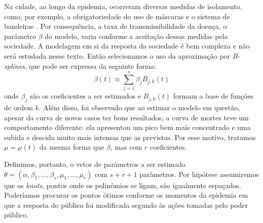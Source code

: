 Na cidade, ao longo da epidemia, ocorreram diversas medidas de isolamento, como, por exemplo, a obrigatoriedade do uso de máscaras \cite{decreto-mascaras} e o sistema de bandeiras \cite{sistemas-bandeiras}.
Por consequência, a taxa de transmissibilidade da doença, o parâmetro $\beta$ do modelo, varia conforme a aceitação dessas medidas pela sociedade.
A modelagem em si da resposta da sociedade é bem complexa e não será estudada nesse texto.
Então selecionamos o uso da aproximação por {\em B-splines}, que pode ser expressa da seguinte forma: 
\begin{equation}
    \label{beta-b-splines}
    \beta(t) \approx \sum_{j=1}^s \beta_j B_{j,k}(t)
\end{equation}
onde $\beta_j$ são os coeficientes a ser estimados e $B_{j,k}(t)$ formam a base de funções de ordem $k$. 
Além disso, foi observado que ao estimar o modelo em questão, apesar da curva de novos casos ter bons resultados, a curva de mortes teve um comportamento diferente: ela apresentou um pico bem mais concentrado e uma subida e descida muito mais intensas que as previstas. 
Por esse motivo, tratamos $\mu = \mu(t)$ da mesma forma que $\beta$, mas com $r$ coeficientes. 

Definimos, portanto, o vetor de parâmetros a ser estimado $\theta = (\alpha, \beta_1, ..., \beta_s, \mu_1, ..., \mu_r)$ com $s+r+1$ parâmetros. 
Por hipótese assumiremos que os {\it knots}, pontos onde os polinômios se ligam, são igualmente espaçados. 
Poderíamos procurar os pontos ótimos conforme os momentos da epidemia em que a resposta do público foi modificada segundo às ações tomadas pelo poder público.